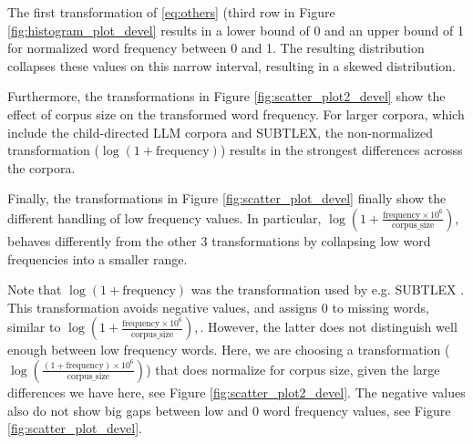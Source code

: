 \documentclass[doc, a4paper]{apa7}
\begin{document}
The first transformation of \ref{eq:others} (third row in Figure \ref{fig:histogram_plot_devel} results in a lower bound of 0 and an upper bound of 1 for normalized word frequency between 0 and 1. The resulting distribution collapses these values on this narrow interval, resulting in a skewed distribution. 

Furthermore, the transformations in Figure \ref{fig:scatter_plot2_devel} show the effect of corpus size on the transformed word frequency. For larger corpora, which include the child-directed LLM corpora and SUBTLEX, the non-normalized transformation ($\log \left( 1 + \text{frequency} \right)$) results in the strongest differences acrosss the corpora. 

Finally, the transformations in Figure \ref{fig:scatter_plot_devel} finally show the different handling of low frequency values. In particular, $\log \left( 1 + \frac{\text{frequency} \times 10^6}{\text{corpus\_size}} \right)$, behaves differently from the other 3 transformations by collapsing low word frequencies into a smaller range. 

Note that $\log \left( 1 + \text{frequency} \right)$ was the transformation used by e.g. SUBTLEX \citep{brysbaert_word_2011}. This transformation avoids negative values, and assigns 0 to missing words, similar to $\log \left( 1 + \frac{\text{frequency} \times 10^6}{\text{corpus\_size}} \right), 
$. However, the latter does not distinguish well enough between low frequency words. Here, we are choosing a transformation ($\log\left(\frac{(1 + \text{frequency}) \times 10^6}{\text{corpus\_size}}\right)$) that does normalize for corpus size, given the large differences we have here, see Figure \ref{fig:scatter_plot2_devel}. The negative values also do not show big gaps between low and 0 word frequency values, see Figure \ref{fig:scatter_plot_devel}. 
\end{document}
